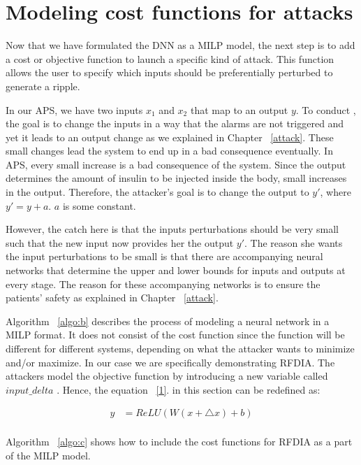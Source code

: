 \section{Modeling cost functions for attacks}
\label{section:costfunction}
Now that we have formulated the DNN as a MILP model, the next step is to add a cost or objective function to launch a specific kind of attack. 
This function allows the user to specify which inputs should be preferentially perturbed to generate a ripple.

In our \ac{APS}, we have two inputs $x_1$ and $x_2$ that map to an output $y$. 
To conduct \attack, the goal is to change the inputs in a way that the alarms are not triggered and yet it leads to an output change as we explained in Chapter ~\ref{attack}. 
These small changes lead the system to end up in a bad consequence eventually. 
In \ac{APS}, every small increase is a bad consequence of the system. 
Since the output determines the amount of insulin to be injected inside the body, small increases in the output.
Therefore, the attacker's goal is to change the output to $y'$, where $y' = y + a$. $a$ is some constant. 

However, the catch here is that the inputs perturbations should be very small such that the new input now provides her the output $y'$.  
The reason she wants the input perturbations to be small is that there are accompanying neural networks that determine the upper and lower bounds for inputs and outputs at every stage. 
The reason for these accompanying networks is to ensure the patients' safety as explained in Chapter ~\ref{attack}.


Algorithm ~\ref{algo:b} describes the process of modeling a neural network in a MILP format.
It does not consist of the cost function since the function will be different for different systems, depending on what the attacker wants to minimize and/or maximize.
In our case we are specifically demonstrating \ac{RFDIA}. 
The attackers model the objective function by introducing a new variable called $input\_delta$ . Hence, the equation ~\ref{1}.
in this section can be redefined as:

\begin{align}
\label{11}
y &=  ReLU(W(x + \bigtriangleup  x ) + b)\\
\end{align}

Algorithm ~\ref{algo:c} shows how to include the cost functions for \ac{RFDIA} as a part of the MILP model. 
 
